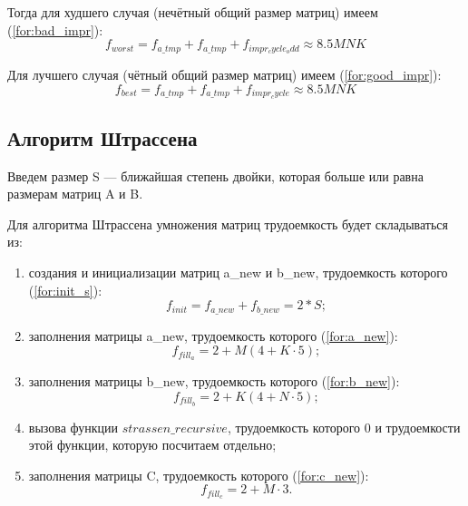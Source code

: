 Тогда для худшего случая (нечётный общий размер матриц) имеем (\ref{for:bad_impr}):
\begin{equation}
	\label{for:bad_impr}
	f_{worst} =  f_{a\_tmp} + f_{a\_tmp} + f_{impr_cycle_odd} \approx 8.5MNK
\end{equation}

Для лучшего случая (чётный общий размер матриц) имеем (\ref{for:good_impr}):
\begin{equation}
	\label{for:good_impr}
	f_{best} = f_{a\_tmp} + f_{a\_tmp} + f_{impr_cycle} \approx 8.5MNK
\end{equation}


\subsection{Алгоритм Штрассена}

Введем размер S --- ближайшая степень двойки, которая больше или равна размерам матриц A и B.


Для алгоритма Штрассена умножения матриц трудоемкость будет складываться из:

\begin{enumerate}[label=\arabic*)]
	\item создания и инициализации матриц a\_new и b\_new, трудоемкость которого (\ref{for:init_s}):
	\begin{equation}
		\label{for:init_s}
		f_{init} = f_{a\_new} + f_{b\_new} = 2 * S;
	\end{equation}
	\item заполнения матрицы a\_new, трудоемкость которого (\ref{for:a_new}):
	\begin{equation}
		\label{for:a_new}
		f_{fill_a} = 2 + M (4 + K \cdot 5);
	\end{equation}
	\item заполнения матрицы b\_new, трудоемкость которого (\ref{for:b_new}):
	\begin{equation}
		\label{for:b_new}
		f_{fill_b} = 2 + K (4 + N \cdot 5);
	\end{equation}
	\item вызова функции $strassen\_recursive$, трудоемкость которого 0 и трудоемкости этой функции, которую посчитаем отдельно;
	\item заполнения матрицы C, трудоемкость которого (\ref{for:c_new}):
	\begin{equation}
		\label{for:c_new}
		f_{fill_c} = 2 + M \cdot 3.
	\end{equation}
	\newline
\end{enumerate}

